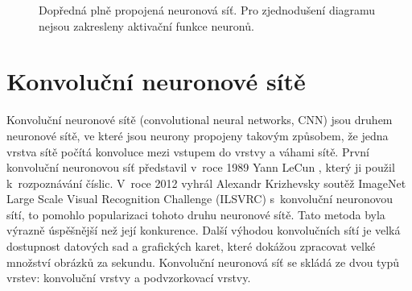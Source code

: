 \begin{figure}
\centering
{}

\caption{
Dopředná plně propojená neuronová síť.
Pro zjednodušení diagramu nejsou zakresleny aktivační funkce neuronů.
}
\label{fig:ffcnn}
\end{figure}

\section{Konvoluční neuronové sítě}
\label{sub:cnn}

Konvoluční neuronové sítě (convolutional neural networks, CNN) jsou druhem neuronové sítě, ve které jsou neurony propojeny takovým způsobem, že jedna vrstva sítě počítá konvoluce mezi vstupem do vrstvy a váhami sítě.
První konvoluční neuronovou síť představil v~roce 1989 Yann LeCun \cite{LeCun1989}, který ji použil k~rozpoznávání číslic.
V~roce 2012 vyhrál Alexandr Krizhevsky soutěž ImageNet Large Scale Visual Recognition Challenge (ILSVRC) \cite{Krizhevsky2012} s~konvoluční neuronovou sítí, to pomohlo popularizaci tohoto druhu neuronové sítě.
Tato metoda byla výrazně úspěšnější než její konkurence.
Další výhodou konvolučních sítí je velká dostupnost datových sad a grafických karet, které dokážou zpracovat velké množství obrázků za sekundu.
Konvoluční neuronová síť se skládá ze dvou typů vrstev: konvoluční vrstvy a podvzorkovací vrstvy.

